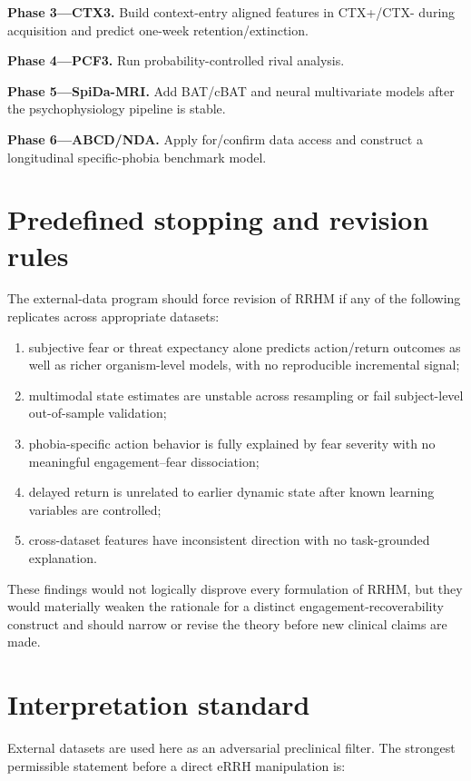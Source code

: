 \documentclass[11pt]{article}
\begin{document}
\textbf{Phase 3---CTX3.} Build context-entry aligned features in CTX+/CTX- during acquisition and predict one-week retention/extinction.

\textbf{Phase 4---PCF3.} Run probability-controlled rival analysis.

\textbf{Phase 5---SpiDa-MRI.} Add BAT/cBAT and neural multivariate models after the psychophysiology pipeline is stable.

\textbf{Phase 6---ABCD/NDA.} Apply for/confirm data access and construct a longitudinal specific-phobia benchmark model.

\section{Predefined stopping and revision rules}

The external-data program should force revision of RRHM if any of the following replicates across appropriate datasets:
\begin{enumerate}[leftmargin=2em]
\item subjective fear or threat expectancy alone predicts action/return outcomes as well as richer organism-level models, with no reproducible incremental signal;
\item multimodal state estimates are unstable across resampling or fail subject-level out-of-sample validation;
\item phobia-specific action behavior is fully explained by fear severity with no meaningful engagement--fear dissociation;
\item delayed return is unrelated to earlier dynamic state after known learning variables are controlled;
\item cross-dataset features have inconsistent direction with no task-grounded explanation.
\end{enumerate}

These findings would not logically disprove every formulation of RRHM, but they would materially weaken the rationale for a distinct engagement-recoverability construct and should narrow or revise the theory before new clinical claims are made.

\section{Interpretation standard}

External datasets are used here as an adversarial preclinical filter. The strongest permissible statement before a direct eRRH manipulation is:
\end{document}
